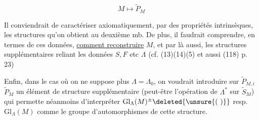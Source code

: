\[
 M\longmapsto\widetilde P_M
\]

Il conviendrait de caractériser axiomatiquement, par des propriétés intrinsèques, les structures qu'on obtient au deuxième mb. De plus, il faudrait comprendre, en termes de ces données, \uline{comment reconstruire} $M$, et par là aussi,
les structures supplémentaires reliant les données $S,F$ etc  $\Lambda$ (cf. (13)(14)(5) et aussi (118) p. 23)

Enfin, dans le cas où on ne suppose plus $\Lambda=\Lambda_0$, on voudrait introduire sur $\widetilde P_{M,i}$  $\widetilde P_M$ un élément de structure supplémentaire (peut-être l'opération de $\Lambda^*$ sur $\widetilde S_M$) qui permette néanmoins d'interpréter $\mathrm{Gl}_\Lambda(M)^{\pm}\deleted{\unsure{(\ )}}$ resp. $\mathrm{Gl}_\Lambda(M)$ comme le groupe d'automorphismes de cette structure.


